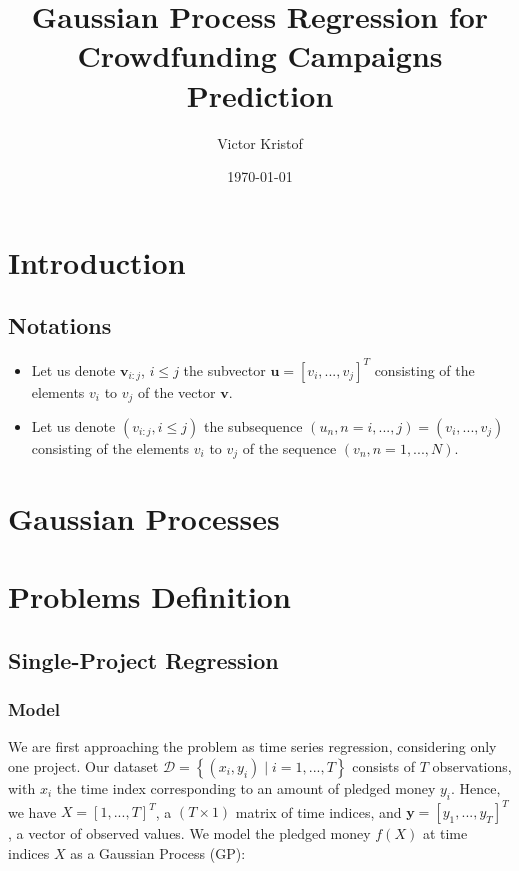 \documentclass[11pt, oneside]{article}   	%
\title{Gaussian Process Regression for Crowdfunding Campaigns Prediction}
\author{Victor Kristof}
\date{\today}								%
\begin{document}
    \maketitle
    \newpage
    \tableofcontents
    \newpage
    \section{Introduction}
        \subsection{Notations}
        
            \begin{itemize}
                \item Let us denote $\mathbf{v}_{i:j}$, $i \leq j$ the subvector $\mathbf{u} = [v_i, ..., v_j]^T$ consisting of the elements $v_i$ to $v_j$ of the vector $\mathbf{v}$.
                \item Let us denote $(v_{i:j}, i \leq j)$ the subsequence $(u_n, n = i, ..., j) = (v_i, ..., v_j)$ consisting of the elements $v_i$ to $v_j$ of the sequence $(v_n, n = 1, ..., N)$.
            \end{itemize}
        
    \section{Gaussian Processes}
    \section{Problems Definition}
    
	\subsection{Single-Project Regression}
        
		\subsubsection*{Model}
             
                    We are first approaching the problem as time series regression, considering only one project. Our dataset $\mathcal{D} = \left\{ (x_i, y_i) \mid i = 1, ..., T \right\}$ consists of $T$ observations, with $x_i$ the time index corresponding to an amount of pledged money $y_i$. Hence, we have $X = [1, ..., T]^T$, a $(T \times 1)$ matrix of time indices, and $\mathbf{y} = [y_1, ..., y_T]^T$, a vector of observed values. We model the pledged money $f(X)$ at time indices $X$ as a Gaussian Process (GP):
                    
\end{document}
